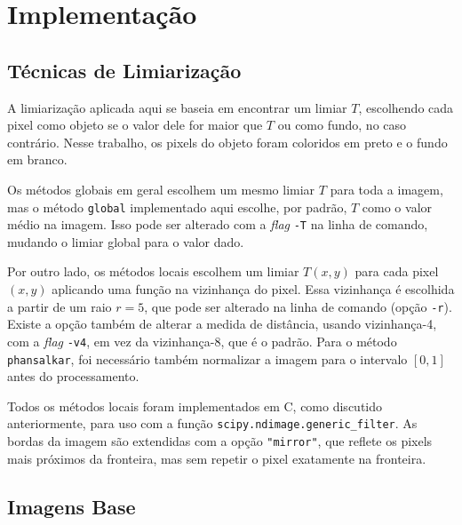 \section{Implementação} \label{sec:impl}

\subsection{Técnicas de Limiarização}

    A limiarização aplicada aqui se baseia em encontrar um limiar $T$, escolhendo cada pixel como objeto se o valor dele for maior que $T$ ou como fundo, no caso contrário. Nesse trabalho, os pixels do objeto foram coloridos em preto e o fundo em branco.

    Os métodos globais em geral escolhem um mesmo limiar $T$ para toda a imagem, mas o método \texttt{global} implementado aqui escolhe, por padrão, $T$ como o valor médio na imagem. Isso pode ser alterado com a \textit{flag} \texttt{-T} na linha de comando, mudando o limiar global para o valor dado.

    Por outro lado, os métodos locais escolhem um limiar $T(x, y)$ para cada pixel $(x, y)$ aplicando uma função na vizinhança do pixel. Essa vizinhança é escolhida a partir de um raio $r = 5$, que pode ser alterado na linha de comando (opção \texttt{-r}). Existe a opção também de alterar a medida de distância, usando vizinhança-4, com a \textit{flag} \texttt{-v4}, em vez da vizinhança-8, que é o padrão. Para o método \texttt{phansalkar}, foi necessário também normalizar a imagem para o intervalo $[0, 1]$ antes do processamento.

    Todos os métodos locais foram implementados em C, como discutido anteriormente, para uso com a função \texttt{scipy.ndimage.generic_filter}. As bordas da imagem são extendidas com a opção \texttt{"mirror"}, que reflete os pixels mais próximos da fronteira, mas sem repetir o pixel exatamente na fronteira.

\subsection{Imagens Base} \label{sec:imgbase}
